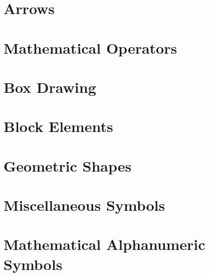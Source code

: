 \documentclass{article}
\begin{document}
\section{Arrows}

\section{Mathematical Operators}

\section{Box Drawing}

\section{Block Elements}

\section{Geometric Shapes}

\section{Miscellaneous Symbols}

%
%
%
%
%
%
%
%
\section{Mathematical Alphanumeric Symbols}
\end{document}
